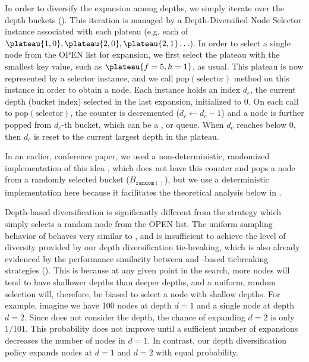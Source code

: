In order to diversify the expansion among depths, we simply
iterate over the depth buckets ().
This iteration is managed by a Depth-Diversified Node Selector instance associated with each plateau (e.g. each of $\plateau{1,0}, \plateau{2,0}, \plateau{2,1}\ldots$).
In order to select a single node from the OPEN list for expansion,
we first select the plateau with the smallest key value, such as $\plateau{f=5,h=1}$, as usual.
This plateau is now represented by a selector instance, and
we call $\text{pop}(\text{selector})$ method on this instance in order to obtain a node.
Each instance holds
an index $d_c$,
the current depth (bucket index) selected in the last expansion,
initialized to 0.
On each call to $\text{pop}(\text{selector})$,
the counter is decremented ($d_c\leftarrow d_c-1$) and
a node is further popped from $d_c$-th bucket, which can be a \lifo, \fifo or \ro queue.
When $d_c$ reaches below 0, then $d_c$
is reset to the current largest depth in the plateau.

In an earlier, conference paper, we used a non-deterministic,
randomized implementation of this idea \cite{Asai2016}, which does not have this counter and pops a node from a randomly selected bucket ($B_{\texttt{random}()}$), but we use a deterministic
implementation here because it facilitates the theoretical analysis below in .

Depth-based diversification is significantly different from the \ro strategy which simply selects a random node from the OPEN list.
The uniform sampling behavior of  \ro behaves very similar to \fifo, and is insufficient to achieve the level of diversity provided by our depth diversification tie-breaking,
which is also already evidenced by the performance similarity between \fifo and \ro-based tiebreaking strategies ().
This is because at any given point in the search, more nodes will tend to have shallower depths than deeper depths, and a uniform, random selection will, therefore, be biased to select a node with shallow depths.
For example, imagine we have 100 nodes at depth $d=1$ and a single node at depth $d=2$.
Since \ro does not consider the depth, the chance of expanding $d=2$ is only $1/101$.
This probability does not improve until a sufficient number of expansions decreases the number of nodes in $d=1$.
In contrast, our depth diversification policy expands nodes at $d=1$ and $d=2$ with equal probability.


